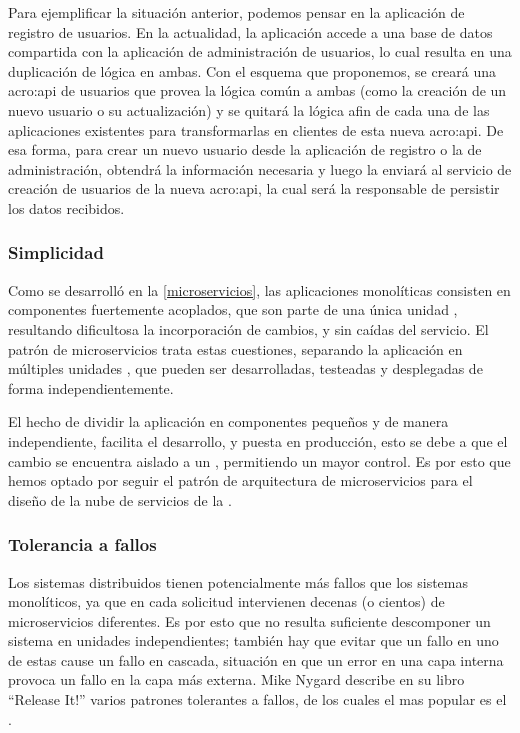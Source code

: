 Para ejemplificar la situación anterior, podemos pensar en la aplicación de registro de usuarios. En la actualidad, la aplicación accede a una base de datos compartida con la aplicación de administración de usuarios, lo cual resulta en una duplicación de lógica en ambas. Con el esquema que proponemos, se creará una \gls{acro:api} de usuarios que provea la lógica común a ambas (como la creación de un nuevo usuario o su actualización) y se quitará la lógica afin de cada una de las aplicaciones existentes para transformarlas en clientes de esta nueva \gls{acro:api}. De esa forma, para crear un nuevo usuario desde la aplicación de registro o la de administración, obtendrá la información necesaria y luego la enviará al servicio de creación de usuarios de la nueva \gls{acro:api}, la cual será la responsable de persistir los datos recibidos.

\subsubsection{Simplicidad}

Como se desarrolló en la \autoref{microservicios}, las aplicaciones monolíticas consisten en componentes fuertemente acoplados, que son parte de una única unidad , resultando dificultosa la incorporación de cambios,  y  sin caídas del servicio.  El patrón de microservicios trata estas cuestiones, separando la aplicación en múltiples unidades , que pueden ser desarrolladas, testeadas y desplegadas de forma independientemente.

El hecho de dividir la aplicación en componentes pequeños y  de manera independiente, facilita el desarrollo,  y puesta en producción, esto se debe a que el cambio se encuentra aislado a un , permitiendo un mayor control.  Es por esto que hemos optado por seguir el patrón de arquitectura de microservicios para el diseño de la nube de servicios de la {\unlp}.

\subsubsection{Tolerancia a fallos}

Los sistemas distribuidos tienen potencialmente más fallos que los sistemas monolíticos, ya que en cada solicitud intervienen decenas (o cientos) de microservicios diferentes\cite[p.~48]{stin2015}. Es por esto que no resulta suficiente descomponer un sistema en unidades independientes; también hay que evitar que un fallo en uno de estas cause un fallo en cascada\cite[p.~4]{stin2015}, situación en que un error en una capa interna provoca un fallo en la capa más externa\cite[p.~65]{nygard2007}. Mike Nygard describe en su libro ``Release It!''\cite{nygard2007} varios patrones tolerantes a fallos, de los cuales el mas popular es el .

